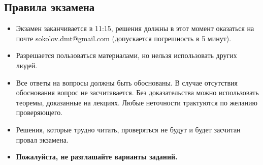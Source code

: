\documentclass[a4paper, 12pt]{article}
\begin{document}

\renewcommand{\coursetitle}{\textsc{Ex}}


\subsection*{Правила экзамена}

\begin{itemize}
    \item Экзамен заканчивается в 11:15, решения должны в этот момент оказаться на почте
        sokolov.dmt@gmail.com (допускается погрешность в 5 минут).
    \item Разрешается пользоваться материалами, но нельзя использовать других людей.
    \item Все ответы на вопросы должны быть обоснованы. В случае отсутствия обоснования вопрос не
        засчитавается. Без доказательства можно использовать теоремы, доказанные на лекциях. Любые
        неточности трактуются по желанию проверяющего.
    \item Решения, которые трудно читать, проверяться не будут и будет засчитан провал экзамена.
    \item \textbf{Пожалуйста, не разглашайте варианты заданий.}
\end{itemize}

\vspace{1cm}
\end{document}
